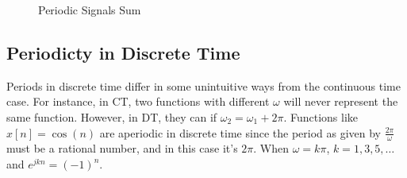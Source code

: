 \begin{figure}
    \centering
    \caption{Periodic Signals Sum}
\end{figure}

\subsection{Periodicty in Discrete Time}
Periods in discrete time differ in some 
unintuitive ways from the continuous time case. 
For instance, in CT, two functions with 
different $\omega$ will never represent 
the same function. However, in DT, they can 
if $\omega_2 = \omega_1 + 2\pi$. Functions like 
$x[n] = \cos(n)$ are aperiodic in discrete time 
since the period as given by $\frac{2\pi}\omega$
must be a rational number, and in this case it's 
$2\pi$. When $\omega = k\pi$, $k = 1, 3, 5, \dots$ and 
$e^{jkn} = (-1)^n$. 